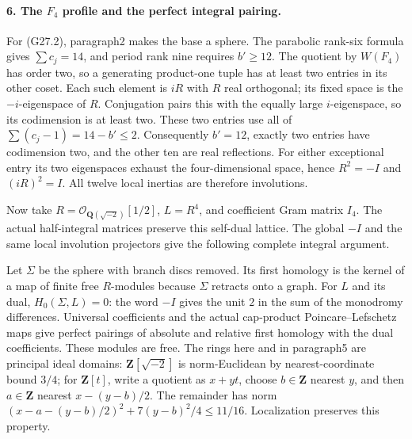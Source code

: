 \paragraph{6. The \(F_4\) profile and the perfect integral pairing.}
For (G27.2), paragraph2 makes the base a sphere.
The parabolic rank-six formula gives
\(\sum c_j=14\), and period rank nine requires \(b'\ge12\).
The quotient by \(W(F_4)\) has order two, so a generating
product-one tuple has at least two entries in its other coset.
Each such element is \(iR\) with \(R\) real orthogonal;
its fixed space is the \(-i\)-eigenspace of \(R\).
Conjugation pairs this with the equally large \(i\)-eigenspace,
so its codimension is at least two.
These two entries use all of
\(\sum(c_j-1)=14-b'\le2\).
Consequently \(b'=12\), exactly two entries have codimension
two, and the other ten are real reflections.
For either exceptional entry its two eigenspaces exhaust the
four-dimensional space, hence \(R^2=-I\) and \((iR)^2=I\).
All twelve local inertias are therefore involutions.

Now take \(R=\mathcal O_{\mathbf Q(\sqrt{-2})}[1/2]\),
\(L=R^4\), and coefficient Gram matrix \(I_4\).
The actual half-integral matrices preserve this self-dual
lattice. The global \(-I\) and the same local involution
projectors give the following complete integral argument.

Let \(\Sigma\) be the sphere with branch discs removed.
Its first homology is the kernel of a map of finite free
\(R\)-modules because \(\Sigma\) retracts onto a graph.
For \(L\) and its dual, \(H_0(\Sigma,L)=0\): the word
\(-I\) gives the unit \(2\) in the sum of the monodromy
differences. Universal coefficients and the actual cap-product
Poincare--Lefschetz maps give perfect pairings of absolute
and relative first homology with the dual coefficients.
These modules are free. The rings here and in paragraph5
are principal ideal domains: \(\mathbf Z[\sqrt{-2}]\) is
norm-Euclidean by nearest-coordinate bound \(3/4\);
for \(\mathbf Z[t]\), write a quotient as \(x+yt\),
choose \(b\in\mathbf Z\) nearest \(y\), and then
\(a\in\mathbf Z\) nearest \(x-(y-b)/2\).
The remainder has norm
\((x-a-(y-b)/2)^2+7(y-b)^2/4\le11/16\).
Localization preserves this property.

